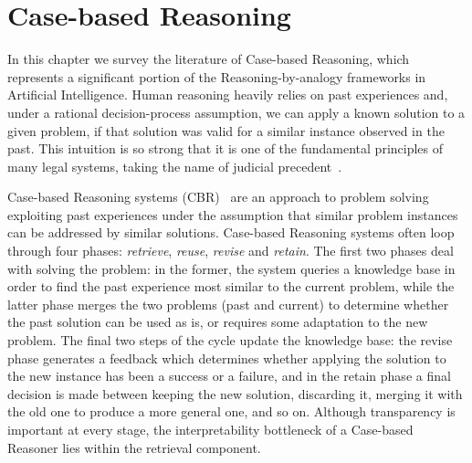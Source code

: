 \chapter{Case-based Reasoning}
\label{chap:cbr}
In this chapter we survey the literature of Case-based Reasoning, which represents a significant portion of the Reasoning-by-analogy frameworks in Artificial Intelligence.
%
Human reasoning heavily relies on past experiences and, under a rational decision-process assumption, we can apply a known solution to a given problem, if that solution was valid for a similar instance observed in the past.
This intuition is so strong that it is one of the fundamental principles of many legal systems, taking the name of judicial precedent~\cite{hanna1957role}.

Case-based Reasoning systems (CBR)~\cite{aamodt1994case,schoenborn2021explainable} are an approach to problem solving exploiting past experiences under the assumption that similar problem instances can be addressed by similar solutions.
Case-based Reasoning systems often loop through four phases: \textit{retrieve}, \textit{reuse}, \textit{revise} and \textit{retain}. The first two phases deal with solving the problem: in the former, the system queries a knowledge base in order to find the past experience most similar to the current problem, while the latter phase merges the two problems (past and current) to determine whether the past solution can be used as is, or requires some adaptation to the new problem.
The final two steps of the cycle update the knowledge base: the revise phase generates a feedback which determines whether applying the solution to the new instance has been a success or a failure, and in the retain phase a final decision is made between keeping the new solution, discarding it, merging it with the old one to produce a more general one, and so on.
%
%
Although transparency is important at every stage, the interpretability bottleneck of a Case-based Reasoner lies within the retrieval component. 

